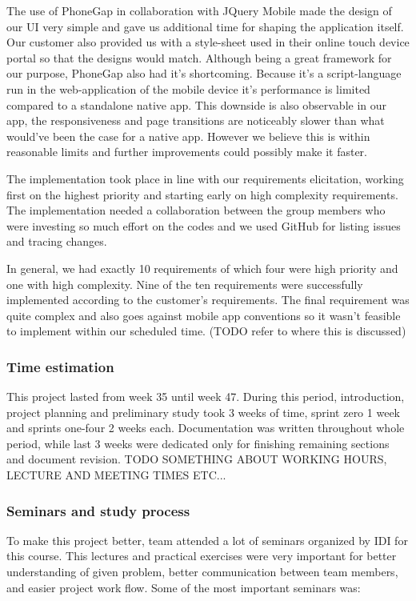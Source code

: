 The use of PhoneGap in collaboration with JQuery Mobile made the design of our UI very simple and gave us additional time for shaping the application itself. 
Our customer also provided us with a style-sheet used in their online touch device portal so that the designs would match.
Although being a great framework for our purpose, PhoneGap also had it's shortcoming.
Because it's a script-language run in the web-application of the mobile device it's performance is limited compared to a standalone native app. 
This downside is also observable in our app, the responsiveness and page transitions are noticeably slower than what would've been the case for a native app.
However we believe this is within reasonable limits and further improvements could possibly make it faster.

The implementation took place in line with our requirements elicitation, working first on the highest priority and starting early on high complexity requirements. 
The implementation needed a collaboration between the group members who were investing so much effort on the codes and we used GitHub for listing issues and tracing changes.

In general, we had exactly 10 requirements of which four were high priority and one with high complexity. 
Nine of the ten requirements were successfully implemented according to the customer's requirements.
The final requirement was quite complex and also goes against mobile app conventions so it wasn't feasible to implement within our scheduled time. (TODO refer to where this is discussed)

	\subsubsection{Time estimation}
	This project lasted from week 35 until week 47. During this period, introduction, project planning and preliminary study took 3 weeks of time, sprint zero 1 week and sprints one-four 2 weeks each. Documentation was written throughout whole period, while last 3 weeks were dedicated only for finishing remaining sections and document revision.\newline
	TODO SOMETHING ABOUT WORKING HOURS, LECTURE AND MEETING TIMES ETC...
	
	
	\subsubsection{Seminars and study process}
	To make this project better, team attended a lot of seminars organized by IDI for this course. This lectures and practical exercises were very important for better understanding of given problem, better communication between team members, and easier project work flow. Some of the most important seminars was:
	
